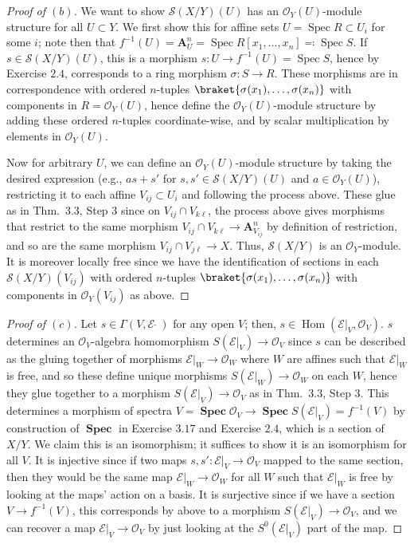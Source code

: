 \documentclass[10pt]{article}
\theoremstyle{definition}
\theoremstyle{remark}
\numberwithin{equation}{section}
\numberwithin{figure}{subsubsection}
\DeclareMathOperator{\Spec}{Spec}
\DeclareMathOperator{\SPEC}{\mathbf{Spec}}
\DeclareMathOperator{\Hom}{Hom}
\newcommand{\EE}{\mathscr{E}}
\newcommand{\OO}{\mathcal{O}}
\newcommand{\Ss}{\mathscr{S}}
\begin{document}
\begin{proof}[Proof of $(b)$]
  We want to show $\Ss(X/Y)(U)$ has an $\OO_Y(U)$-module structure for all $U
  \subset Y$. We first show this for affine sets $U = \Spec R \subset U_i$ for
  some $i$; note then that $f^{-1}(U) = \mathbf{A}^n_U = \Spec R[x_1,\ldots,x_n]
  \eqqcolon \Spec S$. If $s \in \Ss(X/Y)(U)$, this is a morphism $s\colon U \to
  f^{-1}(U) = \Spec S$, hence by Exercise $2.4$, corresponds to a ring morphism $\sigma\colon S \to R$. These morphisms are in correspondence with ordered $n$-tuples $\braket{\sigma(x_1),\ldots,\sigma(x_n)}$ with components in $R = \OO_Y(U)$, hence define the $\OO_Y(U)$-module structure by adding these ordered $n$-tuples coordinate-wise, and by scalar multiplication by elements in $\OO_Y(U)$.
  \par Now for arbitrary $U$, we can define an $\OO_Y(U)$-module structure by taking the desired expression (e.g., $as + s'$ for $s,s' \in \Ss(X/Y)(U)$ and $a \in \OO_Y(U)$), restricting it to each affine $V_{ij} \subset U_i$ and following the process above. These glue as in Thm.~3.3, Step 3 since on $V_{ij} \cap V_{k\ell}$, the process above gives morphisms that restrict to the same morphism $V_{ij} \cap V_{k\ell} \to \mathbf{A}^n_{V_{ij}}$ by definition of restriction, and so are the same morphism $V_{ij} \cap V_{j\ell} \to X$. Thus, $\Ss(X/Y)$ is an $\OO_Y$-module. It is moreover locally free since we have the identification of sections in each $\Ss(X/Y)(V_{ij})$ with ordered $n$-tuples $\braket{\sigma(x_1),\ldots,\sigma(x_n)}$ with components in $\OO_Y(V_{ij})$ as above.
\end{proof}
\begin{proof}[Proof of $(c)$]
  Let $s \in \Gamma(V,\EE\:\check{}\:)$ for any open $V$; then, $s \in
  \Hom(\EE\vert_V,\OO_V)$. $s$ determines an $\OO_V$-algebra homomorphism
  $S(\EE\vert_V) \to \OO_V$ since $s$ can be described as the gluing together of
  morphisms $\EE\vert_W \to \OO_{W}$ where $W$ are affines such that
  $\EE\vert_W$ is free, and so these define unique morphisms $S(\EE\vert_W) \to
  \OO_W$ on each $W$, hence they glue together to a morphism $S(\EE\vert_V) \to
  \OO_V$ as in Thm.~3.3, Step 3. This determines a morphism of spectra $V =
  \SPEC \OO_V \to \SPEC S(\EE\vert_V) = f^{-1}(V)$ by construction of $\SPEC$ in
  Exercise $3.17$ and Exercise $2.4$, which is a section of $X/Y$. We claim this is an isomorphism; it suffices to show it is an isomorphism for all $V$. It is injective since if two maps $s,s' \colon \EE\vert_V \to \OO_V$ mapped to the same section, then they would be the same map $\EE\vert_W \to \OO_W$ for all $W$ such that $\EE\vert_W$ is free by looking at the maps' action on a basis. It is surjective since if we have a section $V \to f^{-1}(V)$, this corresponds by above to a morphism $S(\EE\vert_V) \to \OO_V$, and we can recover a map $\EE\vert_V \to \OO_V$ by just looking at the $S^0(\EE\vert_V)$ part of the map.
\end{proof}
\end{document}
